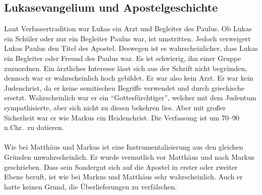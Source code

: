 \subsection*{Lukasevangelium und Apostelgeschichte}
Laut Verfassertradition war Lukas ein Arzt und Begleiter des Paulus. Ob Lukas ein Schüler oder nur ein Begleiter Paulus war, ist umstritten. Jedoch verweigert Lukas Paulus den Titel des Apostel. Deswegen ist es wahrscheinlicher, dass Lukas ein Begleiter oder Freund des Paulus war. Es ist schwierig, ihn einer Gruppe zuzuordnen. Ein ärztliches Interesse lässt sich aus der Schrift nicht begründen, dennoch war er wahrscheinlich hoch gebildet. Er war also kein Arzt. Er war kein Judenchrist, da er keine semitischen Begriffe verwendet und durch griechische ersetzt. Wahrscheinlich war er ein ``Gottesfürchtiger'', welcher mit dem Judentum sympathisierte, aber sich nicht zu diesen bekehren lies. Aber mit großer Sicherheit war er wie Markus ein Heidenchrist. Die Verfassung ist um 70--90 n.Chr.\ zu datieren.
\\~\\
Wie bei Matthäus und Markus ist eine Instrumentalisierung aus den gleichen Gründen unwahrscheinlich. Er wurde vermutlich vor Matthäus und nach Markus geschrieben. Dass sein Sondergut sich auf die Apostel in erster oder zweiter Ebene beruft, ist wie bei Markus und Matthäus sehr wahrscheinlich. Auch er hatte keinen Grund, die Überlieferungen zu verfälschen.
\pagebreak

